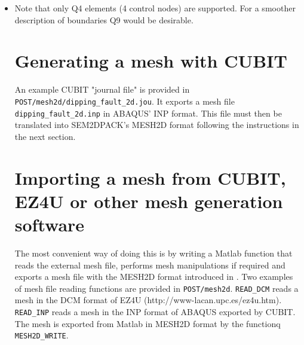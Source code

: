 \begin{itemize}
\item Note that only Q4 elements (4 control nodes) are supported. For a smoother
description of boundaries Q9 would be desirable.

\section{Generating a mesh with CUBIT}

An example CUBIT "journal file" is provided in \texttt{POST/mesh2d/dipping\_fault\_2d.jou}.
It exports a mesh file \texttt{dipping\_fault\_2d.inp} in ABAQUS' INP format.
This file must then be translated into SEM2DPACK's MESH2D format following the 
instructions in the next section.

\section{Importing a mesh from CUBIT, EZ4U or other mesh generation software}

The most convenient way of doing this is by writing 
a Matlab function that reads the external mesh file,
performs mesh manipulations if required
and exports a mesh file with the MESH2D format introduced in .
Two examples of mesh file reading functions are provided in \texttt{POST/mesh2d}.
\texttt{READ\_DCM} reads a mesh in the DCM format of EZ4U (http://www-lacan.upc.es/ez4u.htm).
\texttt{READ\_INP} reads a mesh in the INP format of ABAQUS exported by CUBIT.
The mesh is exported from Matlab in MESH2D format by the functionq \texttt{MESH2D\_WRITE}.

\end{itemize}
